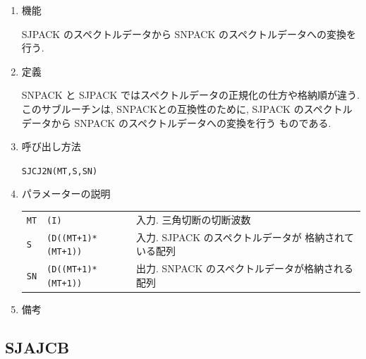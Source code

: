 \documentclass[a4j]{jarticle}
\begin{document}
\begin{enumerate}

\item 機能 

SJPACK のスペクトルデータから SNPACK のスペクトルデータへの変換を行う.

\item 定義

SNPACK と SJPACK ではスペクトルデータの正規化の仕方や格納順が違う.
このサブルーチンは, SNPACKとの互換性のために,
SJPACK のスペクトルデータから SNPACK のスペクトルデータへの変換を行う
ものである.

\item 呼び出し方法 

{\tt SJCJ2N(MT,S,SN)}
  
\item パラメーターの説明

\begin{tabular}{lll}
{\tt MT} & {\tt (I)} & 入力. 三角切断の切断波数\\
{\tt S} & {\tt (D((MT+1)*(MT+1))} & 入力. SJPACK のスペクトルデータが
格納されている配列\\
{\tt SN} & {\tt (D((MT+1)*(MT+1))} & 出力.
SNPACK のスペクトルデータが格納される配列
\end{tabular}

\item 備考

\end{enumerate}


\subsection{SJAJCB}
\end{document}
